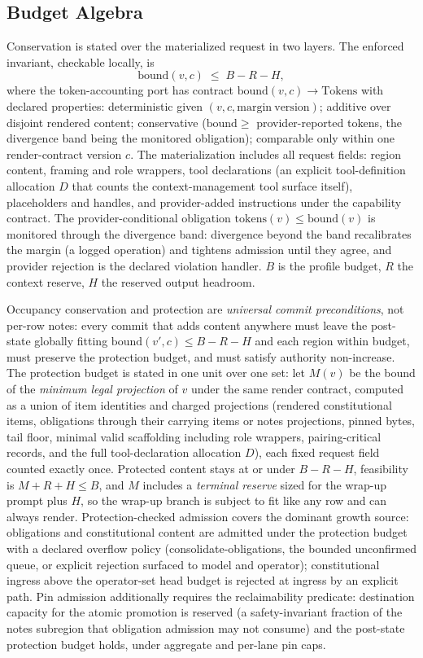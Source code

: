 \documentclass[11pt]{article}
\begin{document}
\subsection{Budget Algebra}
\label{sec:budget}
Conservation is stated over the materialized request in two layers. The enforced invariant, checkable locally, is
\[
\mathrm{bound}(v, c) \;\le\; B - R - H,
\]
where the token-accounting port has contract $\mathrm{bound}(v, c) \to \mathrm{Tokens}$ with declared properties: deterministic given $(v, c, \mathrm{margin\ version})$; additive over disjoint rendered content; conservative ($\mathrm{bound} \ge$ provider-reported tokens, the divergence band being the monitored obligation); comparable only within one render-contract version $c$. The materialization includes all request fields: region content, framing and role wrappers, tool declarations (an explicit tool-definition allocation $D$ that counts the context-management tool surface itself), placeholders and handles, and provider-added instructions under the capability contract. The provider-conditional obligation $\mathrm{tokens}(v) \le \mathrm{bound}(v)$ is monitored through the divergence band: divergence beyond the band recalibrates the margin (a logged operation) and tightens admission until they agree, and provider rejection is the declared violation handler. $B$ is the profile budget, $R$ the context reserve, $H$ the reserved output headroom.

Occupancy conservation and protection are \emph{universal commit preconditions}, not per-row notes: every commit that adds content anywhere must leave the post-state globally fitting $\mathrm{bound}(v', c) \le B - R - H$ and each region within budget, must preserve the protection budget, and must satisfy authority non-increase. The protection budget is stated in one unit over one set: let $M(v)$ be the bound of the \emph{minimum legal projection} of $v$ under the same render contract, computed as a union of item identities and charged projections (rendered constitutional items, obligations through their carrying items or notes projections, pinned bytes, tail floor, minimal valid scaffolding including role wrappers, pairing-critical records, and the full tool-declaration allocation $D$), each fixed request field counted exactly once. Protected content stays at or under $B - R - H$, feasibility is $M + R + H \le B$, and $M$ includes a \emph{terminal reserve} sized for the wrap-up prompt plus $H$, so the wrap-up branch is subject to fit like any row and can always render. Protection-checked admission covers the dominant growth source: obligations and constitutional content are admitted under the protection budget with a declared overflow policy (consolidate-obligations, the bounded unconfirmed queue, or explicit rejection surfaced to model and operator); constitutional ingress above the operator-set head budget is rejected at ingress by an explicit path. Pin admission additionally requires the reclaimability predicate: destination capacity for the atomic promotion is reserved (a safety-invariant fraction of the notes subregion that obligation admission may not consume) and the post-state protection budget holds, under aggregate and per-lane pin caps.
\end{document}
